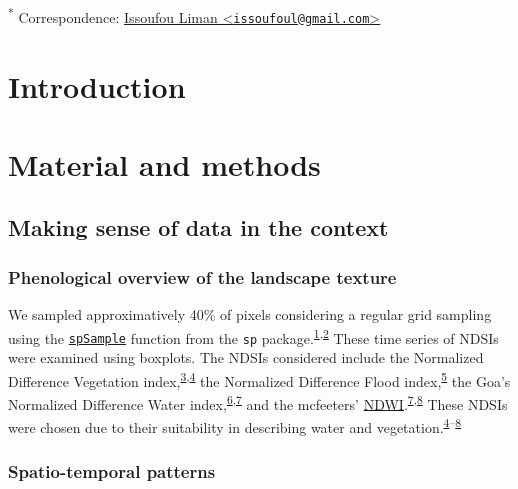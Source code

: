 \documentclass[12pt,oneside]{article}
\begin{document}
\textsuperscript{*} Correspondence: \href{mailto:issoufoul@gmail.com}{Issoufou Liman \textless{}\href{mailto:issoufoul@gmail.com}{\nolinkurl{issoufoul@gmail.com}}\textgreater{}}

\hypertarget{intro}{%
\section{Introduction}\label{intro}}

\hypertarget{I}{%
\section{Material and methods}\label{I}}

\hypertarget{I4}{%
\subsection{Making sense of data in the context}\label{I4}}

\hypertarget{I41}{%
\subsubsection{Phenological overview of the landscape texture}\label{I41}}

We sampled approximatively 40\% of pixels considering a regular grid sampling using the \href{https://www.rdocumentation.org/packages/sp/versions/1.3-1/topics/spsample}{\texttt{spSample}} function from the \texttt{sp} package.\textsuperscript{\protect\hyperlink{ref-Bivand_et_al_2013}{1},\protect\hyperlink{ref-Pebesma_Bivand_2005}{2}} These time series of NDSIs were examined using boxplots. The NDSIs considered include the Normalized Difference Vegetation index,\textsuperscript{\protect\hyperlink{ref-Rouse_et_al_1973}{3},\protect\hyperlink{ref-Tucker_1979}{4}} the Normalized Difference Flood index,\textsuperscript{\protect\hyperlink{ref-Boschetti_et_al_2014}{5}} the Goa's Normalized Difference Water index,\textsuperscript{\protect\hyperlink{ref-Gao_1996}{6},\protect\hyperlink{ref-Ji_et_al_2009}{7}} and the mcfeeters' \href{https://en.wikipedia.org/wiki/Normalized_difference_water_index}{NDWI}.\textsuperscript{\protect\hyperlink{ref-Ji_et_al_2009}{7},\protect\hyperlink{ref-McFeeters_1996}{8}} These NDSIs were chosen due to their suitability in describing water and vegetation.\textsuperscript{\protect\hyperlink{ref-Tucker_1979}{4}--\protect\hyperlink{ref-McFeeters_1996}{8}}

\hypertarget{I42}{%
\subsubsection{Spatio-temporal patterns}\label{I42}}
\end{document}

